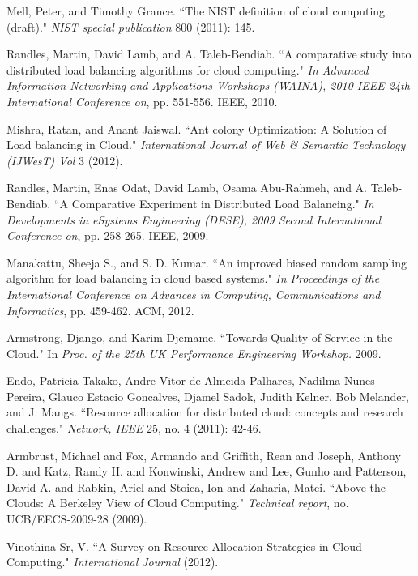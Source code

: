 \vspace{-1in}
\begin{thebibliography}{99}

 Mell, Peter, and Timothy Grance. ``The NIST definition of cloud computing (draft)." \emph{NIST special publication} 800 (2011): 145.

Randles, Martin, David Lamb, and A. Taleb-Bendiab. ``A comparative study into distributed load balancing algorithms for cloud computing." \emph{In Advanced Information Networking and Applications Workshops (WAINA), 2010 IEEE 24th International Conference on}, pp. 551-556. IEEE, 2010.

Mishra, Ratan, and Anant Jaiswal. ``Ant colony Optimization: A Solution of Load balancing in Cloud." \emph{International Journal of Web \& Semantic Technology (IJWesT) Vol }3 (2012).

Randles, Martin, Enas Odat, David Lamb, Osama Abu-Rahmeh, and A. Taleb-Bendiab. ``A Comparative Experiment in Distributed Load Balancing." \emph{In Developments in eSystems Engineering (DESE), 2009 Second International Conference on}, pp. 258-265. IEEE, 2009.

Manakattu, Sheeja S., and S. D. Kumar. ``An improved biased random sampling algorithm for load balancing in cloud based systems." \emph{In Proceedings of the International Conference on Advances in Computing, Communications and Informatics}, pp. 459-462. ACM, 2012.

 Armstrong, Django, and Karim Djemame. ``Towards Quality of Service in the Cloud." In \emph{Proc. of the 25th UK Performance Engineering Workshop.} 2009.

 Endo, Patricia Takako, Andre Vitor de Almeida Palhares, Nadilma Nunes Pereira, Glauco Estacio Goncalves, Djamel Sadok, Judith Kelner, Bob Melander, and J. Mangs. ``Resource allocation for distributed cloud: concepts and research challenges." \emph{Network, IEEE} 25, no. 4 (2011): 42-46.

 Armbrust, Michael and Fox, Armando and Griffith, Rean and Joseph, Anthony D. and Katz, Randy H. and Konwinski, Andrew and Lee, Gunho and Patterson, David A. and Rabkin, Ariel and Stoica, Ion and Zaharia, Matei. ``Above the Clouds: A Berkeley View of Cloud Computing." \emph{Technical report}, no. UCB/EECS-2009-28 (2009).

 Vinothina Sr, V. ``A Survey on Resource Allocation Strategies in Cloud Computing." \emph{International Journal} (2012).


\end{thebibliography}
